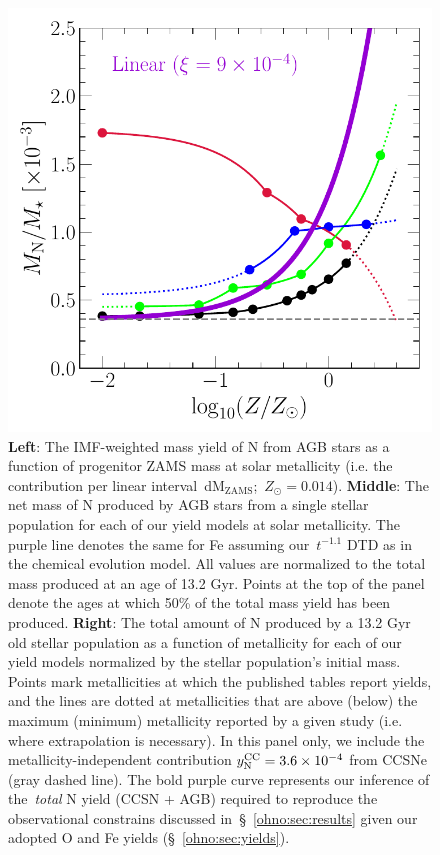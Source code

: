 {\begin{landscape}
\begin{figure}
\includegraphics[scale = 0.51]{ssp_production_metdep.pdf}
\caption{
\textbf{Left}: The IMF-weighted mass yield of N from AGB stars as a function of
progenitor ZAMS mass at solar metallicity (i.e. the contribution per linear
interval~dM$_\text{ZAMS}$;~$Z_\odot = 0.014$).
\textbf{Middle}: The net mass of N produced by AGB stars from a single stellar
population for each of our yield models at solar metallicity.
The purple line denotes the same for Fe assuming our~$t^{-1.1}$ DTD as in the
\citet{Johnson2021} chemical evolution model.
All values are normalized to the total mass produced at an age of 13.2 Gyr.
Points at the top of the panel denote the ages at which 50\% of the total mass
yield has been produced.
\textbf{Right}: The total amount of N produced by a 13.2 Gyr old stellar
population as a function of metallicity for each of our yield models normalized
by the stellar population's initial mass.
Points mark metallicities at which the published tables report yields, and the
lines are dotted at metallicities that are above (below) the maximum (minimum)
metallicity reported by a given study (i.e. where extrapolation is necessary).
In this panel only, we include the metallicity-independent contribution
$y_\text{N}^\text{CC} = 3.6\times10^{-4}$ from CCSNe (gray dashed line).
The bold purple curve represents our inference of the~\textit{total} N yield
(CCSN + AGB) required to reproduce the observational constrains discussed
in~\S~\ref{ohno:sec:results} given our adopted O and Fe yields (\S~\ref{ohno:sec:yields}).
}
\label{ohno:fig:ssp}
\end{figure}
\end{landscape}
\clearpage
}

